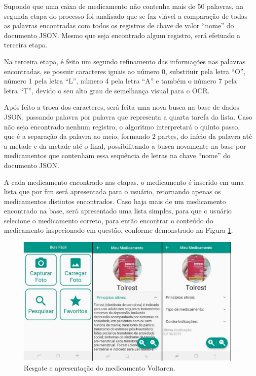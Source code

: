 Supondo que uma caixa de medicamento não contenha mais de 50 palavras, na segunda etapa do processo foi analisado que se faz viável a comparação de todas as palavras encontradas com todos os registros de chave de valor ``nome'' do documento JSON. Mesmo que seja encontrado algum registro, será efetuado a terceira etapa.

Na terceira etapa, é feito um segundo refinamento das informações nas palavras encontradas, se possuir caracteres iguais ao número 0, substituir pela letra ``O'', número 1 pela letra ``L'', número 4 pela letra ``A'' e também o número 7 pela letra ``T'', devido o seu alto grau de semelhança visual para o OCR. 

Após feito a troca dos caracteres, será feita uma nova busca na base de dados JSON, passando palavra por palavra que representa a quarta tarefa da lista. Caso não seja encontrado nenhum registro, o algoritmo %
interpretará o quinto passo, que é a separação da palavra ao meio, formando 2 partes, do início da palavra até a metade e da metade até o final, possibilitando a busca novamente na base por medicamentos que contenham essa sequência de letras na chave ``nome'' do documento JSON.

A cada medicamento encontrado nas etapas, o medicamento é inserido em uma lista que por fim será apresentada para o usuário, retornando apenas os medicamentos distintos encontrados. Caso haja mais de um medicamento encontrado na base, será apresentado uma lista simples, para que o usuário selecione o medicamento correto, para então encontrar o conteúdo do medicamento inspecionado em questão, conforme demonstrado na Figura \ref{app}. 

 \begin{figure}[h!]
	\centering
	\includegraphics[width=0.99\textwidth]{Imagens/telas_app.jpg} 
	\caption[Resgate e apresentação do medicamento Voltaren.]{Resgate e apresentação do medicamento Voltaren.}
	\label{app}
\end{figure}

